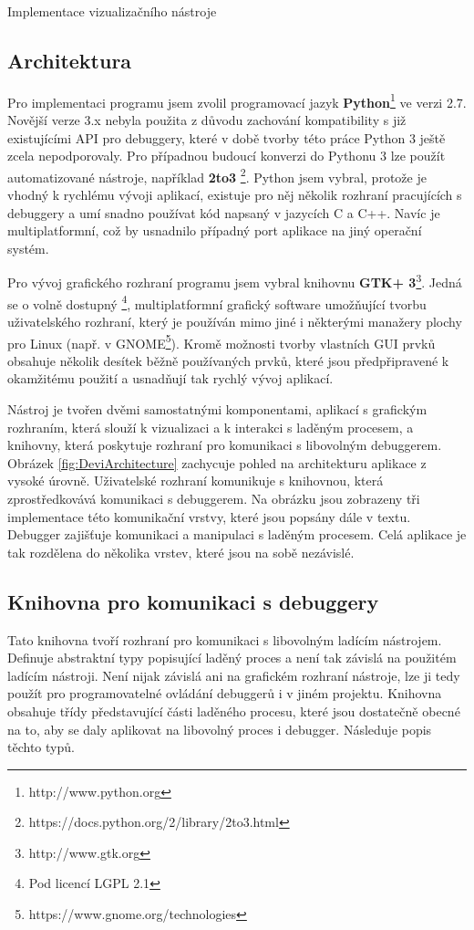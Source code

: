 \documentclass[bc,male,python,dept460]{diploma}						%
\newcommand{\parspace}[1][]{
	\ifthenelse{\isempty{#1}}{\vspace{5mm}}{\vspace{#1}}
	\par
}
\begin{document}
\begin{section}{Implementace vizualizačního nástroje}
	\subsection{Architektura}
	\par Pro implementaci programu jsem zvolil programovací jazyk \textbf{Python}\footnote{http://www.python.org} ve verzi 2.7. Novější verze 3.x nebyla použita
	z důvodu zachování kompatibility s již existujícími API pro debuggery, které v době tvorby této práce Python 3 ještě zcela nepodporovaly. Pro případnou
	budoucí konverzi do Pythonu 3 lze použít automatizované nástroje, například \textbf{2to3} \footnote{https://docs.python.org/2/library/2to3.html}.
	Python jsem vybral, protože je vhodný k rychlému vývoji aplikací, existuje pro něj několik rozhraní pracujících s debuggery a umí snadno používat
	kód napsaný v jazycích C a C++. Navíc je multiplatformní, což by usnadnilo případný port aplikace na jiný operační systém.
	
	\parspace Pro vývoj grafického rozhraní programu jsem vybral knihovnu \textbf{GTK+ 3}\footnote{http://www.gtk.org}. Jedná se o volně dostupný
	\footnote{Pod licencí LGPL 2.1}, multiplatformní grafický software umožňující tvorbu uživatelského rozhraní, který je používán mimo jiné i
	některými manažery plochy pro Linux (např. v GNOME\footnote{https://www.gnome.org/technologies}). Kromě možnosti tvorby vlastních
	GUI prvků obsahuje několik desítek běžně používaných prvků, které jsou předpřipravené k okamžitému použití a usnadňují tak rychlý vývoj aplikací.
	
	\parspace Nástroj je tvořen dvěmi samostatnými komponentami, aplikací s grafickým rozhraním, která slouží k vizualizaci a k interakci s laděným procesem,
	a knihovny, která poskytuje rozhraní pro komunikaci s libovolným debuggerem. Obrázek \ref{fig:DeviArchitecture} zachycuje pohled na architekturu aplikace
	z vysoké úrovně.
	Uživatelské rozhraní komunikuje s knihovnou, která zprostředkovává komunikaci s debuggerem. Na obrázku jsou zobrazeny tři implementace této komunikační vrstvy,
	které jsou popsány dále v textu. Debugger zajišťuje komunikaci a manipulaci s laděným procesem. Celá aplikace je tak rozdělena do několika
	vrstev, které jsou na sobě nezávislé.
	
		
	\subsection{Knihovna pro komunikaci s debuggery}
	\label{sec:DebuggerApi}
		Tato knihovna tvoří rozhraní pro komunikaci s libovolným ladícím nástrojem. Definuje abstraktní typy popisující laděný proces a není tak závislá na
		použitém ladícím nástroji. Není nijak závislá ani na grafickém rozhraní nástroje, lze ji tedy použít pro programovatelné ovládání debuggerů i v jiném
		projektu. Knihovna obsahuje třídy představující části laděného procesu, které jsou dostatečně obecné na to, aby se daly aplikovat na libovolný
		proces i debugger. Následuje popis těchto typů.
		

\end{section}
\end{document}

